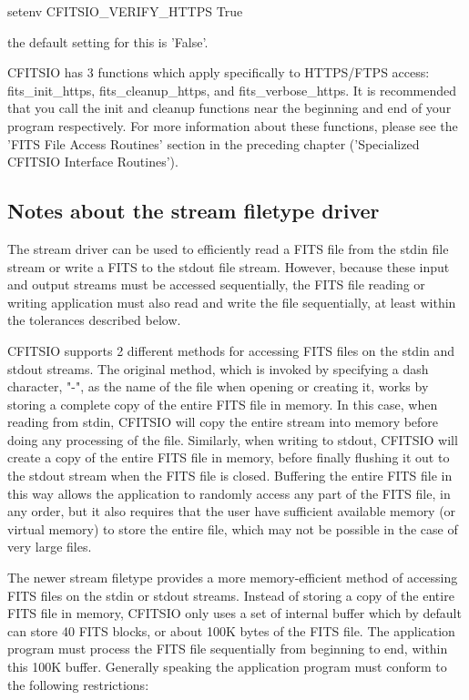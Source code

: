 \documentclass[11pt]{book}
\begin{document}
setenv CFITSIO\_VERIFY\_HTTPS True

the default setting for this is 'False'.

CFITSIO has 3 functions which apply specifically to HTTPS/FTPS access:  fits\_init\_https, 
fits\_cleanup\_https, and fits\_verbose\_https. It is recommended that you call the 
init and cleanup functions near the beginning and end of your program respectively. 
For more information about these functions, please see the 'FITS File Access Routines'
section in the preceding chapter ('Specialized CFITSIO Interface Routines'). 

\subsection{Notes about the stream filetype driver}

The stream driver can be used to efficiently read a FITS file from the stdin
file stream or write a FITS to the stdout file stream.  However, because these
input and output streams must be accessed sequentially, the FITS file reading or
writing application must also read and write the file sequentially, at least
within the tolerances described below.

CFITSIO supports 2 different methods for accessing FITS files on the stdin and
stdout streams.  The original method, which is invoked by specifying a dash
character, "-", as the name of the file when opening or creating it, works by
storing a complete copy of the entire FITS file in memory.  In this case, when
reading from stdin, CFITSIO will copy the entire stream into memory before doing
any processing of the file.  Similarly, when writing to stdout, CFITSIO will
create a copy of the entire FITS file in memory, before finally flushing it out
to  the stdout stream when the FITS file is closed.  Buffering the entire FITS
file in this way allows the application to randomly access any part of the FITS
file, in any order, but it also requires that the user have sufficient available
memory (or virtual memory) to store the entire file, which may not be possible
in the case of very large files.

The newer stream filetype provides a more memory-efficient method of accessing
FITS files on the stdin or stdout streams.  Instead of storing a copy of the
entire FITS file in memory, CFITSIO only uses a set of internal  buffer which by
default can store  40 FITS blocks, or about  100K bytes of the FITS file.  The
application program must process the FITS file sequentially from beginning to
end, within this 100K buffer.  Generally speaking the application  program must
conform to the following restrictions:
\end{document}
